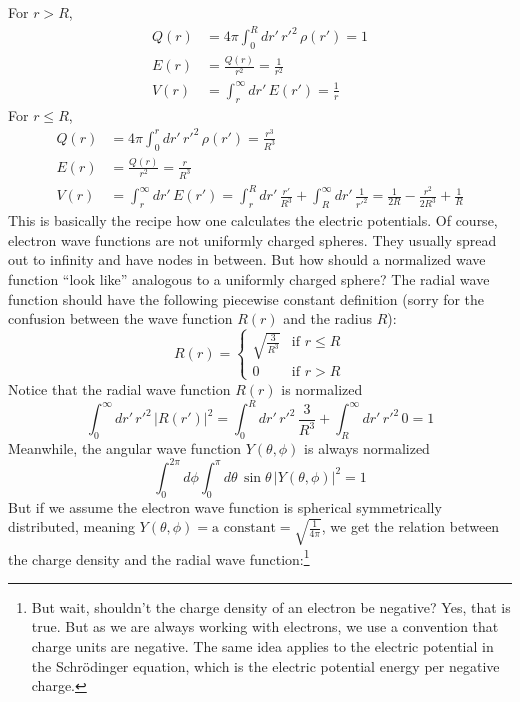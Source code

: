 For $r > R$,
\begin{align} \label{eq:uniCharge>}
Q(r) & = 4\pi \int_0^R dr'\,r'^2\, \rho(r') = 1 \\
E(r) & = \frac{Q(r)}{r^2} = \frac{1}{r^2} \\
V(r) & = \int_{r}^{\infty} dr'\, E(r') = \frac{1}{r}
\end{align}
%
For $r \le R$,
\begin{align} \label{eq:uniCharge<}
Q(r) & = 4\pi \int_0^r dr'\,r'^2\, \rho(r') = \frac{r^3}{R^3} \\
E(r) & = \frac{Q(r)}{r^2} = \frac{r}{R^3} \\
V(r) & = \int_r^\infty dr'\, E(r')
       = \int_r^R dr'\, \frac{r'}{R^3} + \int_R^\infty dr'\, \frac{1}{r'^2}
       = \frac{1}{2R} - \frac{r^2}{2R^3} + \frac{1}{R} \label{eq:uniPot}
\end{align}
%
This is basically the recipe how one calculates the electric potentials.
Of course, electron wave functions are not uniformly charged spheres.
They usually spread out to infinity and have nodes in between. But how
should a normalized wave function ``look like'' analogous to a uniformly
charged sphere? The radial wave function should have the following piecewise constant definition
(sorry for the confusion between the wave function $R(r)$ and the radius $R$):
\begin{equation} \label{eq:uniWF}
  R(r) =
  \begin{cases}
  \sqrt{\displaystyle\frac{3}{R^3}} & \text{if } r \le R \\
  0 & \text{if } r > R
  \end{cases}
\end{equation}
%
Notice that the radial wave function $R(r)$ is normalized
\begin{equation} \label{eq:normR}
\int_0^{\infty} dr'\,r'^2\, |R(r')|^2 = \int_0^R dr'\,r'^2\, \frac{3}{R^3} + \int_R^{\infty} dr'\,r'^2\, 0 = 1
\end{equation}
%
Meanwhile, the angular wave function $Y(\theta,\phi)$ is always normalized
\begin{equation} \label{eq:normY}
\int_0^{2\pi} d\phi \int_0^{\pi} d\theta\,\sin{\theta}\, |Y(\theta,\phi)|^2 = 1
\end{equation}
%
But if we assume the electron wave function is spherical symmetrically distributed,
meaning $Y(\theta,\phi) = \text{a constant} = \sqrt{\frac{1}{4\pi}}$, we get the
relation between the charge density and the radial wave function:\footnote{But wait,
shouldn't the charge density of an electron be negative? Yes, that is true. But as
we are always working with electrons, we use a convention that charge units are negative.
The same idea applies to the electric potential in the Schr\"{o}dinger equation,
which is the electric potential energy per negative charge.}
